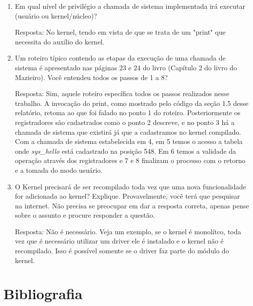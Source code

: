\documentclass[a4paper, 12pt]{article}
\begin{document}
\begin{enumerate}
		\item Em qual nível de privilégio a chamada de sistema implementada irá executar (usuário ou kernel/núcleo)?
		
		Resposta: No kernel, tendo em vista de que se trata de um "print" que necessita do auxílio do kernel.
		
		\item Um roteiro típico contendo as etapas da execução de uma chamada de sistema é apresentado nas páginas 23 e 24 do livro (Capítulo 2 do livro do Mazieiro). Você entendeu todos os passos de 1 a 8?
		
		Resposta: Sim, aquele roteiro específica todos os passos realizados nesse trabalho. A invocação do print, como mostrado pelo código da seção 1.5 desse relatório, retoma ao que foi falado no ponto 1 do roteiro. Posteriormente os registradores são cadastrados como o ponto 2 descreve, e no ponto 3 há a chamada de sistema que existirá já que a cadastramos no kernel compilado. Com a chamada de sistema estabelecida em 4, em 5 temos o acesso a tabela onde \textit{sys\_hello} está cadastrado na posição 548. Em 6 temos a validade da operação através dos registradores e 7 e 8 finalizam o processo com o retorno e a tomada do modo usuário.
		
		\item O Kernel precisará de ser recompilado toda vez que uma nova funcionalidade for adicionada ao kernel? Explique. Provavelmente, você terá que pesquisar na internet. Não precisa se preocupar em dar a resposta correta, apenas pense sobre o assunto e procure responder a questão.
		
		Resposta: Não é necessário. Veja um exemplo, se o kernel é monolítco, toda vez que é necessário utilizar um driver ele é instalado e o kernel não é recompilado. Isso é possível somente se o driver faz parte do módulo do kernel.
		
	\end{enumerate}
\newpage

\section*{Bibliografia}
\end{document}
